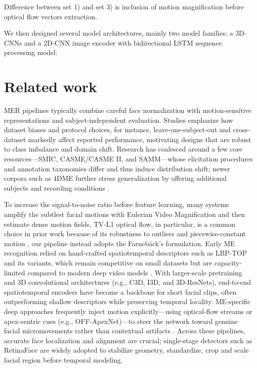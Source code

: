\documentclass{article}
\begin{document}
Difference between set 1) and set 3) is inclusion of motion magnification before optical flow vectors extraction.

We then designed several model architectures, mainly two model families: a 3D-CNNs and a 2D-CNN image encoder with bidirectional LSTM sequence processing model.

\section{Related work }
MER pipelines typically combine careful face normalization with motion-sensitive representations and subject-independent evaluation. Studies emphasize how dataset biases and protocol choices, for instance, leave-one-subject-out and cross-dataset markedly affect reported performance, motivating designs that are robust to class imbalance and domain shift. Research has coalesced around a few core resources—SMIC, CASME/CASME II, and SAMM—whose elicitation procedures and annotation taxonomies differ and thus induce distribution shift; newer corpora such as 4DME further stress generalization by offering additional subjects and recording conditions \cite{wang2021}.

To increase the signal-to-noise ratio before feature learning, many systems amplify the subtlest facial motions with Eulerian Video Magnification and then estimate dense motion fields, TV-L1 optical flow, in particular, is a common choice in prior work because of its robustness to outliers and piecewise-constant motion \cite{li2013}, our pipeline instead adopts the Farnebäck’s formulation. Early ME recognition relied on hand-crafted spatiotemporal descriptors such as LBP-TOP and its variants, which remain competitive on small datasets but are capacity-limited compared to modern deep video models \cite{tran2015}. With larger-scale pretraining and 3D convolutional architectures (e.g., C3D, I3D, and 3D-ResNets), end-to-end spatiotemporal encoders have become a backbone for short facial clips, often outperforming shallow descriptors while preserving temporal locality. ME-specific deep approaches frequently inject motion explicitly—using optical-flow streams or apex-centric cues (e.g., OFF-ApexNet)—to steer the network toward genuine facial micromovements rather than contextual artifacts \cite{carreira2017}. Across these pipelines, accurate face localization and alignment are crucial; single-stage detectors such as RetinaFace are widely adopted to stabilize geometry, standardize, crop and scale facial region before temporal modeling.
\end{document}
